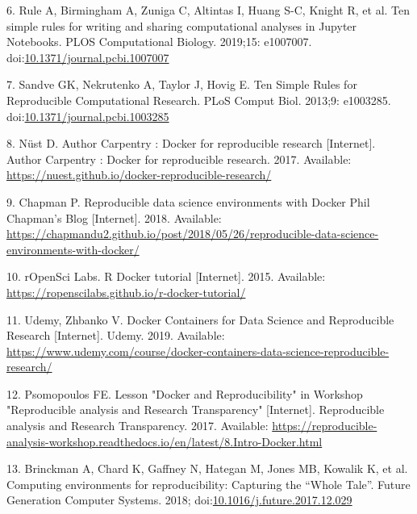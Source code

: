 \documentclass[10pt,letterpaper]{article}
\begin{document}
\leavevmode\hypertarget{ref-rule_ten_2019}{}%
6. Rule A, Birmingham A, Zuniga C, Altintas I, Huang S-C, Knight R, et
al. Ten simple rules for writing and sharing computational analyses in
Jupyter Notebooks. PLOS Computational Biology. 2019;15: e1007007.
doi:\href{https://doi.org/10.1371/journal.pcbi.1007007}{10.1371/journal.pcbi.1007007}

\leavevmode\hypertarget{ref-sandve_ten_2013}{}%
7. Sandve GK, Nekrutenko A, Taylor J, Hovig E. Ten Simple Rules for
Reproducible Computational Research. PLoS Comput Biol. 2013;9: e1003285.
doi:\href{https://doi.org/10.1371/journal.pcbi.1003285}{10.1371/journal.pcbi.1003285}

\leavevmode\hypertarget{ref-nust_author_2017}{}%
8. Nüst D. Author Carpentry : Docker for reproducible research
{[}Internet{]}. Author Carpentry : Docker for reproducible research.
2017. Available:
\url{https://nuest.github.io/docker-reproducible-research/}

\leavevmode\hypertarget{ref-chapman_reproducible_2018}{}%
9. Chapman P. Reproducible data science environments with Docker Phil
Chapman's Blog {[}Internet{]}. 2018. Available:
\url{https://chapmandu2.github.io/post/2018/05/26/reproducible-data-science-environments-with-docker/}

\leavevmode\hypertarget{ref-ropensci_labs_r_2015}{}%
10. rOpenSci Labs. R Docker tutorial {[}Internet{]}. 2015. Available:
\url{https://ropenscilabs.github.io/r-docker-tutorial/}

\leavevmode\hypertarget{ref-udemy_docker_2019}{}%
11. Udemy, Zhbanko V. Docker Containers for Data Science and
Reproducible Research {[}Internet{]}. Udemy. 2019. Available:
\url{https://www.udemy.com/course/docker-containers-data-science-reproducible-research/}

\leavevmode\hypertarget{ref-psomopoulos_lesson_2017}{}%
12. Psomopoulos FE. Lesson "Docker and Reproducibility" in Workshop
"Reproducible analysis and Research Transparency" {[}Internet{]}.
Reproducible analysis and Research Transparency. 2017. Available:
\url{https://reproducible-analysis-workshop.readthedocs.io/en/latest/8.Intro-Docker.html}

\leavevmode\hypertarget{ref-brinckman_computing_2018}{}%
13. Brinckman A, Chard K, Gaffney N, Hategan M, Jones MB, Kowalik K, et
al. Computing environments for reproducibility: Capturing the ``Whole
Tale''. Future Generation Computer Systems. 2018;
doi:\href{https://doi.org/10.1016/j.future.2017.12.029}{10.1016/j.future.2017.12.029}
\end{document}
